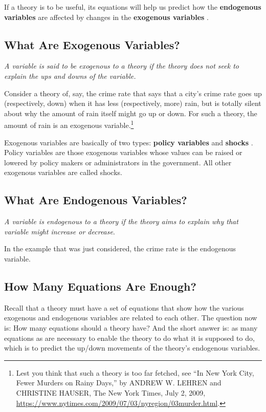 \documentclass[
  letterpaper,
]{book}
\theoremstyle{plain}
\theoremstyle{remark}
\begin{document}
If a theory is to be useful, its equations will help us predict how the
\textbf{endogenous variables}  are affected
by changes in the \textbf{exogenous variables}
.

\subsection{What Are Exogenous Variables?}\label{sec-exovar}

\emph{A variable is said to be exogenous to a theory if the theory does
not seek to explain the ups and downs of the variable.}

Consider a theory of, say, the crime rate that says that a city's crime
rate goes up (respectively, down) when it has less (respectively, more)
rain, but is totally silent about why the amount of rain itself might go
up or down. For such a theory, the amount of rain is an exogenous
variable.\footnote{Lest you think that such a theory is too far fetched,
  see ``In New York City, Fewer Murders on Rainy Days,'' by ANDREW W.
  LEHREN and CHRISTINE HAUSER, The New York Times, July 2, 2009,
  \url{https://www.nytimes.com/2009/07/03/nyregion/03murder.html}.}

Exogenous variables are basically of two types: \textbf{policy
variables}  and
\textbf{shocks} . Policy variables are
those exogenous variables whose values can be raised or lowered by
policy makers or administrators in the government. All other exogenous
variables are called shocks.

\subsection{What Are Endogenous Variables?}\label{sec-endovar}

\emph{A variable is endogenous to a theory if the theory aims to explain
why that variable might increase or decrease}.

In the example that was just considered, the crime rate is the
endogenous variable.

\subsection{How Many Equations Are Enough?}\label{sec-howmanyeq}

Recall that a theory must have a set of equations that show how the
various exogenous and endogenous variables are related to each other.
The question now is: How many equations should a theory have? And the
short answer is: as many equations as are necessary to enable the theory
to do what it is supposed to do, which is to predict the up/down
movements of the theory's endogenous variables.
\end{document}
